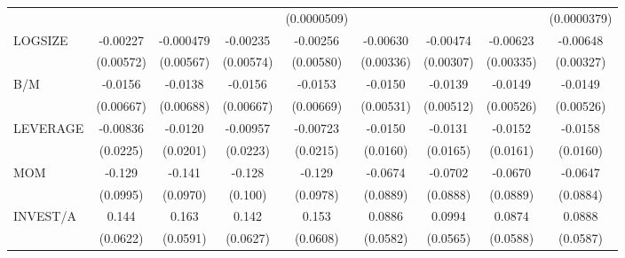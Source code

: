 \begin{table}[htbp]
\begin{tabular}{l*{8}{c}}
                    &                     &                     &                     & (0.0000509)         &                     &                     &                     & (0.0000379)         \\
LOGSIZE             &    -0.00227         &   -0.000479         &    -0.00235         &    -0.00256         &    -0.00630\sym{*}  &    -0.00474         &    -0.00623\sym{*}  &    -0.00648\sym{*}  \\
                    &   (0.00572)         &   (0.00567)         &   (0.00574)         &   (0.00580)         &   (0.00336)         &   (0.00307)         &   (0.00335)         &   (0.00327)         \\
B/M                 &     -0.0156\sym{**} &     -0.0138\sym{**} &     -0.0156\sym{**} &     -0.0153\sym{**} &     -0.0150\sym{***}&     -0.0139\sym{***}&     -0.0149\sym{***}&     -0.0149\sym{***}\\
                    &   (0.00667)         &   (0.00688)         &   (0.00667)         &   (0.00669)         &   (0.00531)         &   (0.00512)         &   (0.00526)         &   (0.00526)         \\
LEVERAGE            &    -0.00836         &     -0.0120         &    -0.00957         &    -0.00723         &     -0.0150         &     -0.0131         &     -0.0152         &     -0.0158         \\
                    &    (0.0225)         &    (0.0201)         &    (0.0223)         &    (0.0215)         &    (0.0160)         &    (0.0165)         &    (0.0161)         &    (0.0160)         \\
MOM                 &      -0.129         &      -0.141         &      -0.128         &      -0.129         &     -0.0674         &     -0.0702         &     -0.0670         &     -0.0647         \\
                    &    (0.0995)         &    (0.0970)         &     (0.100)         &    (0.0978)         &    (0.0889)         &    (0.0888)         &    (0.0889)         &    (0.0884)         \\
INVEST/A            &       0.144\sym{**} &       0.163\sym{***}&       0.142\sym{**} &       0.153\sym{**} &      0.0886         &      0.0994\sym{*}  &      0.0874         &      0.0888         \\
                    &    (0.0622)         &    (0.0591)         &    (0.0627)         &    (0.0608)         &    (0.0582)         &    (0.0565)         &    (0.0588)         &    (0.0587)         \\

\end{tabular}
\end{table}
